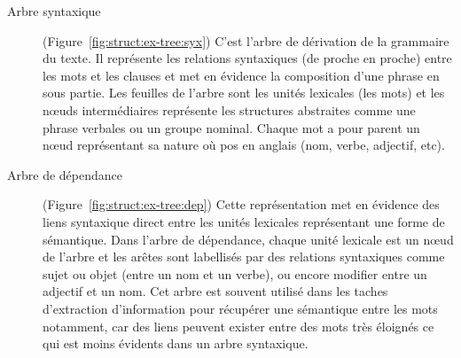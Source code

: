 \begin{description}
    \item[Arbre syntaxique]
          (Figure~\ref{fig:struct:ex-tree:syx})
          C'est l'arbre de dérivation de la grammaire du texte.
          Il représente les relations syntaxiques (de proche en proche) entre les mots et les clauses et met en évidence la composition d'une phrase en sous partie.
          Les feuilles de l'arbre sont les unités lexicales (les mots) et les nœuds intermédiaires représente les structures abstraites comme une phrase verbales ou un groupe nominal.
          Chaque mot a pour parent un nœud représentant sa nature où \gls{pos} en anglais (nom, verbe, adjectif, etc).

    \item[Arbre de dépendance]
          (Figure~\ref{fig:struct:ex-tree:dep})
          Cette représentation met en évidence des liens syntaxique direct entre les unités lexicales représentant une forme de sémantique.
          Dans l'arbre de dépendance, chaque unité lexicale est un nœud de l'arbre et les arêtes sont labellisés par des relations syntaxiques comme sujet ou objet (entre un nom et un verbe), ou encore modifier entre un adjectif et un nom.
          Cet arbre est souvent utilisé dans les taches d'extraction d'information pour récupérer une sémantique entre les mots notamment, car des liens peuvent exister entre des mots très éloignés ce qui est moins évidents dans un arbre syntaxique.
\end{description}

